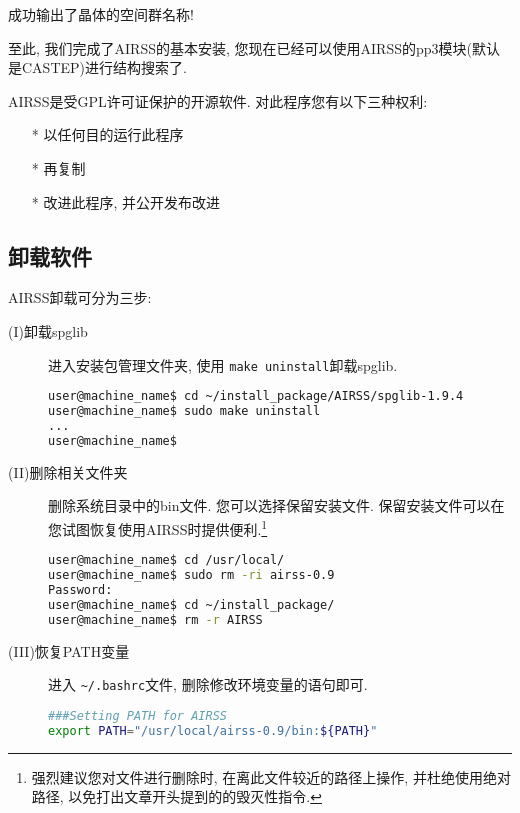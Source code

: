 \documentclass[a4paper, 10pt]{article}
\begin{document}
成功输出了晶体的空间群名称! 

至此, 我们完成了AIRSS的基本安装, 您现在已经可以使用AIRSS的pp3模块(默认是CASTEP)进行结构搜索了.

AIRSS是受GPL许可证保护的开源软件. 对此程序您有以下三种权利:
\begin{enumerate}
\item [*]以任何目的运行此程序
\item [*]再复制
\item [*]改进此程序, 并公开发布改进
\end{enumerate}

\subsection{卸载软件}
AIRSS卸载可分为三步:
\begin{description}
\item [(I)卸载spglib] 进入安装包管理文件夹, 使用 \verb|make uninstall|卸载spglib.
\begin{lstlisting}[language={bash}]
user@machine_name$ cd ~/install_package/AIRSS/spglib-1.9.4
user@machine_name$ sudo make uninstall
...
user@machine_name$
\end{lstlisting}

\item [(II)删除相关文件夹] 删除系统目录中的bin文件. 您可以选择保留安装文件. 保留安装文件可以在您试图恢复使用AIRSS时提供便利.\footnote{强烈建议您对文件进行删除时, 在离此文件较近的路径上操作, 并杜绝使用绝对路径, 以免打出文章开头提到的的毁灭性指令.}
\begin{lstlisting}[language={bash}]
user@machine_name$ cd /usr/local/
user@machine_name$ sudo rm -ri airss-0.9 
Password:
user@machine_name$ cd ~/install_package/
user@machine_name$ rm -r AIRSS
\end{lstlisting}

\item [(III)恢复PATH变量] 进入 \verb|~/.bashrc|文件, 删除修改环境变量的语句即可.
\begin{lstlisting}[language={bash}]
###Setting PATH for AIRSS
export PATH="/usr/local/airss-0.9/bin:${PATH}"
\end{lstlisting}
\end{description}
\end{document}
